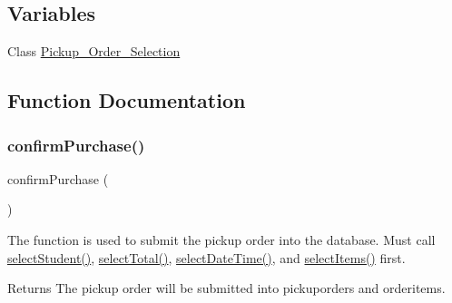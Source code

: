 \subsection*{Variables}
\begin{DoxyCompactItemize}
\item 
Class \mbox{\hyperlink{_pickup___order___selection_8class_8php_a97cbe643c0895109f345f68609533958}{Pickup\+\_\+\+Order\+\_\+\+Selection}}
\end{DoxyCompactItemize}


\subsection{Function Documentation}
\mbox{\label{_pickup___order___selection_8class_8php_a539ea0c001b23b8d52ffadcec3bc3174}} 
\subsubsection{\texorpdfstring{confirmPurchase()}{confirmPurchase()}}
{\footnotesize\ttfamily confirm\+Purchase (\begin{DoxyParamCaption}{ }\end{DoxyParamCaption})}

The function is used to submit the pickup order into the database. Must call \mbox{\hyperlink{_pickup___order___selection_8class_8php_aa3d29d516196eed16f5553dd20b8011e}{select\+Student()}}, \mbox{\hyperlink{_pickup___order___selection_8class_8php_a8479e007f854c94229714a8425c5b6c0}{select\+Total()}}, \mbox{\hyperlink{_pickup___order___selection_8class_8php_a6481f7053a635ccc85738d41bc186de2}{select\+Date\+Time()}}, and \mbox{\hyperlink{_pickup___order___selection_8class_8php_ab30920ac61f282a414092277587a25a1}{select\+Items()}} first. \begin{DoxyReturn}{Returns}
The pickup order will be submitted into pickuporders and orderitems. 
\end{DoxyReturn}
\mbox{\label{_pickup___order___selection_8class_8php_ad9a4c0f627cd2a6db20fe86395ba89eb}} 
